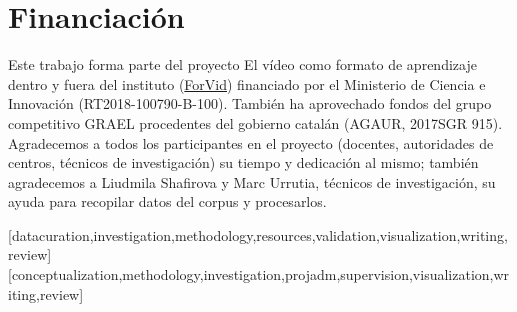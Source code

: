 \documentclass[spanish]{textolivre}
\begin{document}
\section{Financiación}\label{sec-conclusao}
Este trabajo forma parte del proyecto El vídeo como formato de aprendizaje dentro y fuera del instituto (\hyperlink{https://sites.google.com/view/forvid/home}{ForVid}) financiado por el Ministerio de Ciencia e Innovación (RT2018-100790-B-100). También ha aprovechado fondos del grupo competitivo GRAEL procedentes del gobierno catalán (AGAUR, 2017SGR 915). Agradecemos a todos los participantes en el proyecto (docentes, autoridades de centros, técnicos de investigación) su tiempo y dedicación al mismo; también agradecemos a Liudmila Shafirova y Marc Urrutia, técnicos de investigación, su ayuda para recopilar datos del corpus y procesarlos.


\printbibliography\label{sec-bib}


\begin{contributors}
[datacuration,investigation,methodology,resources,validation,visualization,writing,review]
[conceptualization,methodology,investigation,projadm,supervision,visualization,writing,review]
\end{contributors}
\end{document}
